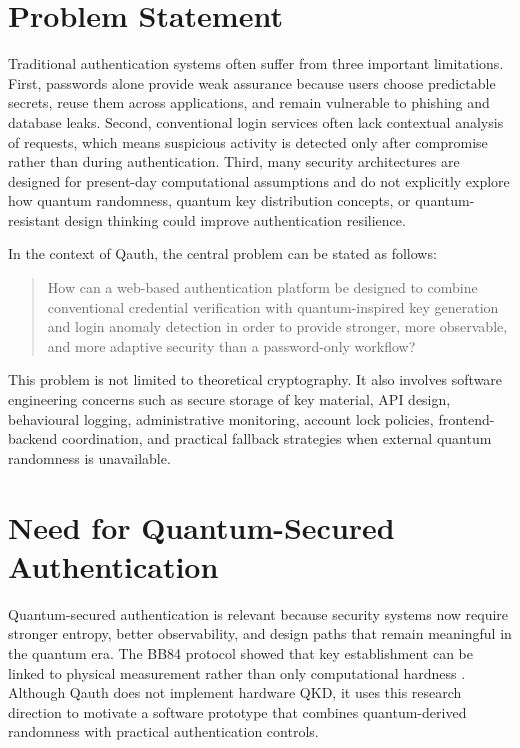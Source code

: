 \documentclass[12pt,a4paper]{report}
\begin{document}
\section{Problem Statement}
Traditional authentication systems often suffer from three important limitations. First, passwords alone provide weak assurance because users choose predictable secrets, reuse them across applications, and remain vulnerable to phishing and database leaks. Second, conventional login services often lack contextual analysis of requests, which means suspicious activity is detected only after compromise rather than during authentication. Third, many security architectures are designed for present-day computational assumptions and do not explicitly explore how quantum randomness, quantum key distribution concepts, or quantum-resistant design thinking could improve authentication resilience.

In the context of Qauth, the central problem can be stated as follows:

\begin{quote}
\noindent How can a web-based authentication platform be designed to combine conventional credential verification with quantum-inspired key generation and login anomaly detection in order to provide stronger, more observable, and more adaptive security than a password-only workflow?
\end{quote}

This problem is not limited to theoretical cryptography. It also involves software engineering concerns such as secure storage of key material, API design, behavioural logging, administrative monitoring, account lock policies, frontend-backend coordination, and practical fallback strategies when external quantum randomness is unavailable.

\section{Need for Quantum-Secured Authentication}
Quantum-secured authentication is relevant because security systems now require stronger entropy, better observability, and design paths that remain meaningful in the quantum era. The BB84 protocol showed that key establishment can be linked to physical measurement rather than only computational hardness \cite{bb84}. Although Qauth does not implement hardware QKD, it uses this research direction to motivate a software prototype that combines quantum-derived randomness with practical authentication controls.
\end{document}
